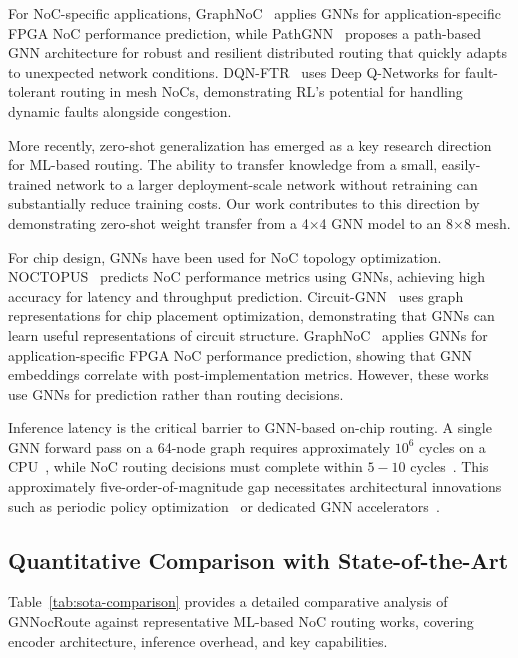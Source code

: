 For NoC-specific applications, GraphNoC~\cite{graphnoc2024} applies GNNs for application-specific FPGA NoC performance prediction, while PathGNN~\cite{pathgnn2025} proposes a path-based GNN architecture for robust and resilient distributed routing that quickly adapts to unexpected network conditions. DQN-FTR~\cite{dqnftr2025} uses Deep Q-Networks for fault-tolerant routing in mesh NoCs, demonstrating RL's potential for handling dynamic faults alongside congestion.

More recently, zero-shot generalization has emerged as a key research direction for ML-based routing. The ability to transfer knowledge from a small, easily-trained network to a larger deployment-scale network without retraining can substantially reduce training costs. Our work contributes to this direction by demonstrating zero-shot weight transfer from a 4$\times$4 GNN model to an 8$\times$8 mesh.

For chip design, GNNs have been used for NoC topology optimization. NOCTOPUS~\cite{noctopus2026} predicts NoC performance metrics using GNNs, achieving high accuracy for latency and throughput prediction. Circuit-GNN~\cite{mirhoseini2021} uses graph representations for chip placement optimization, demonstrating that GNNs can learn useful representations of circuit structure. GraphNoC~\cite{graphnoc2024} applies GNNs for application-specific FPGA NoC performance prediction, showing that GNN embeddings correlate with post-implementation metrics. However, these works use GNNs for prediction rather than routing decisions.

Inference latency is the critical barrier to GNN-based on-chip routing. A single GNN forward pass on a 64-node graph requires approximately $10^6$ cycles on a CPU~\cite{xiao2024}, while NoC routing decisions must complete within $5-10$ cycles~\cite{wang2022maar}. This approximately five-order-of-magnitude gap necessitates architectural innovations such as periodic policy optimization~\cite{periodic2025} or dedicated GNN accelerators~\cite{xiao2024}.

\subsection{Quantitative Comparison with State-of-the-Art}

Table~\ref{tab:sota-comparison} provides a detailed comparative analysis of GNNocRoute against representative ML-based NoC routing works, covering encoder architecture, inference overhead, and key capabilities.

